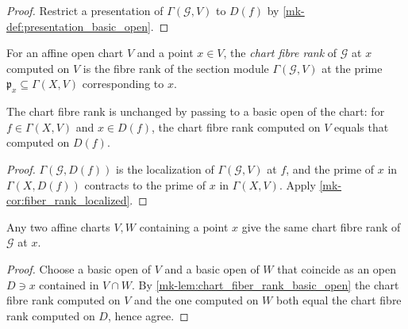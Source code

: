 \begin{proof}
  \leanok
  Restrict a presentation of \(\Gamma(\mathcal G, V)\) to \(D(f)\) by
  \ref{mk-def:presentation_basic_open}.
\end{proof}

\begin{definition}
  \label{mk-def:chart_fiber_rank}
  \leanok

  For an affine open chart \(V\) and a point \(x \in V\), the \emph{chart
  fibre rank} of \(\mathcal G\) at \(x\) computed on \(V\) is the fibre rank
  of the section module \(\Gamma(\mathcal G, V)\) at the prime
  \(\mathfrak p_x \subseteq \Gamma(X, V)\) corresponding to \(x\).
\end{definition}

\begin{lemma}
  \label{mk-lem:chart_fiber_rank_basic_open}
  \leanok

  The chart fibre rank is unchanged by passing to a basic open of the chart:
  for \(f \in \Gamma(X, V)\) and \(x \in D(f)\), the chart fibre rank computed
  on \(V\) equals that computed on \(D(f)\).
\end{lemma}

\begin{proof}
  \leanok
  \(\Gamma(\mathcal G, D(f))\) is the localization of
  \(\Gamma(\mathcal G, V)\) at \(f\), and the prime of \(x\) in
  \(\Gamma(X, D(f))\) contracts to the prime of \(x\) in \(\Gamma(X, V)\).
  Apply \ref{mk-cor:fiber_rank_localized}.
\end{proof}

\begin{theorem}
  \label{mk-thm:chart_fiber_rank_eq}
  \leanok

  Any two affine charts \(V, W\) containing a point \(x\) give the same chart
  fibre rank of \(\mathcal G\) at \(x\).
\end{theorem}

\begin{proof}
  \leanok
  Choose a basic open of \(V\) and a basic open of \(W\) that coincide as an
  open \(D \ni x\) contained in \(V \cap W\).  By
  \ref{mk-lem:chart_fiber_rank_basic_open} the chart fibre rank computed on
  \(V\) and the one computed on \(W\) both equal the chart fibre rank computed
  on \(D\), hence agree.
\end{proof}

